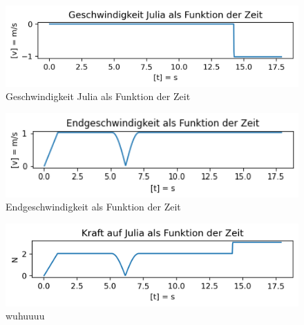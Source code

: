 \documentclass[../main.tex]{subfiles}
\begin{document}
    \begin{figure}[H]
        \begin{center}
            \centerline{\includegraphics[width=155mm]{./images/Inelastisch/GeschwindigkeitJulia}}
            \caption{Geschwindigkeit Julia als Funktion der Zeit}
            \label{fig:GeschwindigkeitJulia}
        \end{center}
    \end{figure}



    \begin{figure}[H]
        \begin{center}
            \centerline{\includegraphics[width=155mm]{./images/Inelastisch/Endgeschwindigkeit}}
            \caption{Endgeschwindigkeit als Funktion der Zeit}
            \label{fig:Endgeschwindigkeit}
        \end{center}
    \end{figure}

    \begin{figure}[H]
        \begin{center}
            \centerline{\includegraphics[width=155mm]{./images/Inelastisch/forceOnJulia}}
            \caption{wuhuuuu}
            \label{fig:forceOnJulia}
        \end{center}
    \end{figure}
\end{document}
